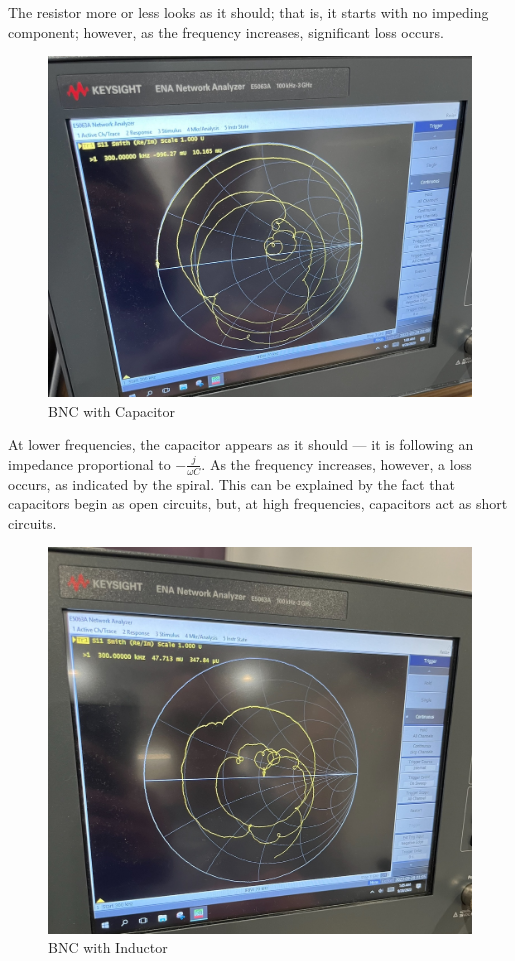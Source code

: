 \documentclass[
	letterpaper, %
	10pt, %
]{CSUniSchoolLabReport}
\begin{document}
The resistor more or less looks as it should; that is, it starts with no impeding component; however, as the frequency increases, significant loss occurs.

\begin{figure}[H]
  \centering
  \includegraphics[width=.75\textwidth]{Figures/Lab One/CapacitorBNC.png}
  \caption{BNC with Capacitor}
  \label{fig:7}
\end{figure}

At lower frequencies, the capacitor appears as it should — it is following an impedance proportional to $-\frac{j}{\omega C}$. As the frequency increases, however, a loss occurs, as indicated by the spiral. This can be explained by the fact that capacitors begin as open circuits, but, at high frequencies, capacitors act as short circuits.

\begin{figure}[H]
  \centering
  \includegraphics[width=.75\textwidth]{Figures/Lab One/InductorBNC.png}
  \caption{BNC with Inductor}
  \label{fig:8}
\end{figure}
\end{document}
